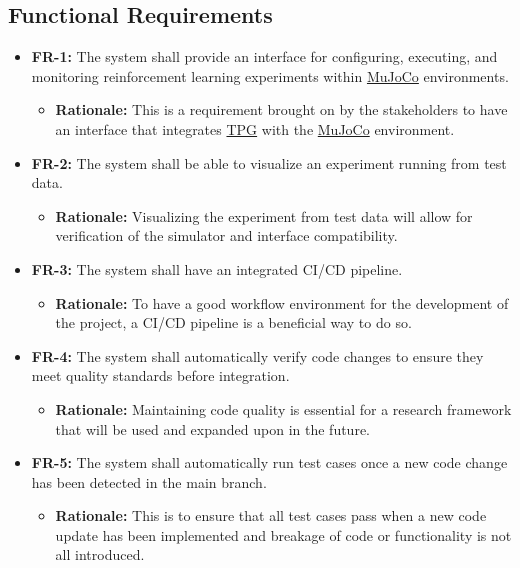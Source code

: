 \documentclass[12pt]{article}
\newcommand{\lips}{\textit{Insert your content here.}}
\begin{document}
\subsection{Functional Requirements}
\begin{itemize}
\item \label{FR-1} \textbf{FR-1:} The system shall provide an interface for configuring, executing, and monitoring reinforcement learning experiments within \hyperref[def:mujoco]{MuJoCo} environments.
  \begin{itemize}
    \item \textbf{Rationale:} This is a requirement brought on by the stakeholders to have an interface that integrates \hyperref[def:tpg]{TPG} with the \hyperref[def:mujoco]{MuJoCo} environment.
  \end{itemize}
\item \label{FR-2} \textbf{FR-2:} The system shall be able to visualize an experiment running from test data.
  \begin{itemize}
    \item \textbf{Rationale:} Visualizing the experiment from test data will allow for verification of the simulator and interface compatibility.
  \end{itemize}
  \item \label{FR-3} \textbf{FR-3:} The system shall have an integrated CI/CD pipeline.
  \begin{itemize}
    \item \textbf{Rationale:} To have a good workflow environment for the development of the project, a CI/CD pipeline is a beneficial way to do so.
  \end{itemize}
\item \label{FR-4} \textbf{FR-4:} The system shall automatically verify code changes to ensure they meet quality standards before integration.
  \begin{itemize}
    \item \textbf{Rationale:} Maintaining code quality is essential for a research framework that will be used and expanded upon in the future.
  \end{itemize}
\item \label{FR-5} \textbf{FR-5:} The system shall automatically run test cases once a new code change has been detected in the main branch.
  \begin{itemize}
    \item \textbf{Rationale:} This is to ensure that all test cases pass when a new code update has been implemented and breakage of code or functionality is not all introduced.

\end{itemize}
\end{itemize}
\end{document}
